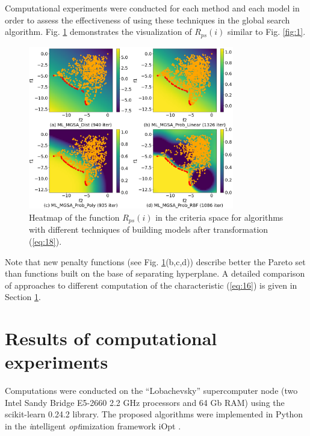 \documentclass[runningheads]{llncs}
\begin{document}
Computational experiments were conducted for each method and each model in order to assess the effectiveness of using these techniques in the global search algorithm. Fig. \ref{fig:2} demonstrates the visualization of $R_{ps}(i)$ similar to Fig. \ref{fig:1}.
\begin{figure}[t!]
\centering
\includegraphics[width=0.8\textwidth]{fig2.png}
\caption{Heatmap of the function $R_{ps}(i)$ in the criteria space for algorithms with different techniques of building models after transformation (\ref{eq:18}).} 
\label{fig:2}
\end{figure}

Note that new penalty functions (see Fig. \ref{fig:2}(b,c,d)) describe better the Pareto set than functions built on the base of separating hyperplane. A detailed comparison of approaches to different computation of the characteristic (\ref{eq:16}) is given in Section \ref{sec:5}. 

\section{Results of computational experiments}
\label{sec:5}

Computations were conducted on the ``Lobachevsky'' supercomputer node (two Intel Sandy Bridge E5-2660 2.2 GHz processors and 64 Gb RAM) using the scikit-learn 0.24.2 library.
The proposed algorithms were implemented in Python in the \textit{i}ntelligent \textit{opt}imization framework iOpt \cite{iOpt_url}.


\end{document}
